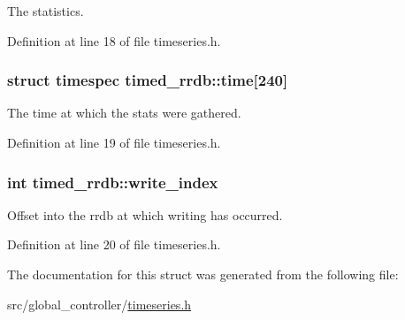 The statistics. 



Definition at line 18 of file timeseries.\-h.

\hypertarget{structtimed__rrdb_abcf16b68b8b0bb8eb6a3c1e266b4c2f8}{
\subsubsection[{time}]{\setlength{\rightskip}{0pt plus 5cm}struct timespec timed\-\_\-rrdb\-::time\mbox{[}240\mbox{]}}}\label{structtimed__rrdb_abcf16b68b8b0bb8eb6a3c1e266b4c2f8}


The time at which the stats were gathered. 



Definition at line 19 of file timeseries.\-h.

\hypertarget{structtimed__rrdb_ab0c1ce0ef397283f1f93ed5d03583bab}{
\subsubsection[{write\-\_\-index}]{\setlength{\rightskip}{0pt plus 5cm}int timed\-\_\-rrdb\-::write\-\_\-index}}\label{structtimed__rrdb_ab0c1ce0ef397283f1f93ed5d03583bab}


Offset into the rrdb at which writing has occurred. 



Definition at line 20 of file timeseries.\-h.



The documentation for this struct was generated from the following file\-:\begin{DoxyCompactItemize}
\item 
src/global\-\_\-controller/\hyperlink{timeseries_8h}{timeseries.\-h}\end{DoxyCompactItemize}

